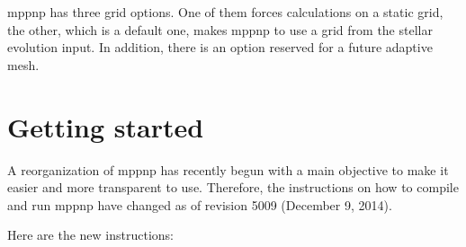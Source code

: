 mppnp has three grid options. One of them forces calculations on a static grid,
the other, which is a default one, makes mppnp to use a grid from the stellar evolution input. In addition,
there is an option reserved for a future adaptive mesh.

\section{Getting started}
\label{sec:getstarted}

A reorganization of mppnp has recently begun with a main objective to make
it easier and more transparent to use. Therefore, the instructions on how to
compile and run mppnp have changed as of revision 5009 (December 9, 2014).

Here are the new instructions:

